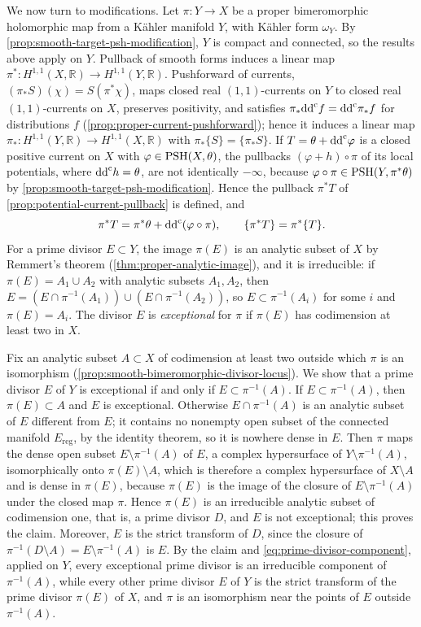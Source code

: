We now turn to modifications. Let $\pi\colon Y\to X$ be a proper bimeromorphic holomorphic map from a K\"ahler manifold $Y$, with K\"ahler form $\omega_Y$. By \cref{prop:smooth-target-psh-modification}, $Y$ is compact and connected, so the results above apply on $Y$. Pullback of smooth forms induces a linear map $\pi^*\colon H^{1,1}(X,\mathbb R)\to H^{1,1}(Y,\mathbb R)$. Pushforward of currents, $(\pi_*S)(\chi)=S(\pi^*\chi)$, maps closed real $(1,1)$-currents on $Y$ to closed real $(1,1)$-currents on $X$, preserves positivity, and satisfies $\pi_*\mathrm{dd}^{\mathrm{c}} f=\mathrm{dd}^{\mathrm{c}}\pi_*f$ for distributions $f$ (\cref{prop:proper-current-pushforward}); hence it induces a linear map $\pi_*\colon H^{1,1}(Y,\mathbb R)\to H^{1,1}(X,\mathbb R)$ with $\pi_*\{S\}=\{\pi_*S\}$. If $T=\theta+\mathrm{dd}^{\mathrm{c}}\varphi$ is a closed positive current on $X$ with $\varphi\in\mathrm{PSH}(X,\theta)$, the pullbacks $(\varphi+h)\circ\pi$ of its local potentials, where $\mathrm{dd}^{\mathrm{c}} h=\theta$, are not identically $-\infty$, because $\varphi\circ\pi\in\mathrm{PSH}(Y,\pi^*\theta)$ by \cref{prop:smooth-target-psh-modification}. Hence the pullback $\pi^*T$ of \cref{prop:potential-current-pullback} is defined, and
\[
 \pi^*T=\pi^*\theta+\mathrm{dd}^{\mathrm{c}}(\varphi\circ\pi),\qquad\{\pi^*T\}=\pi^*\{T\}.
\]
For a prime divisor $E\subset Y$, the image $\pi(E)$ is an analytic subset of $X$ by Remmert's theorem (\cref{thm:proper-analytic-image}), and it is irreducible: if $\pi(E)=A_1\cup A_2$ with analytic subsets $A_1,A_2$, then $E=(E\cap\pi^{-1}(A_1))\cup(E\cap\pi^{-1}(A_2))$, so $E\subset\pi^{-1}(A_i)$ for some $i$ and $\pi(E)=A_i$. The divisor $E$ is \emph{exceptional} for $\pi$ if $\pi(E)$ has codimension at least two in $X$.

Fix an analytic subset $A\subset X$ of codimension at least two outside which $\pi$ is an isomorphism (\cref{prop:smooth-bimeromorphic-divisor-locus}). We show that a prime divisor $E$ of $Y$ is exceptional if and only if $E\subset\pi^{-1}(A)$. If $E\subset\pi^{-1}(A)$, then $\pi(E)\subset A$ and $E$ is exceptional. Otherwise $E\cap\pi^{-1}(A)$ is an analytic subset of $E$ different from $E$; it contains no nonempty open subset of the connected manifold $E_{\mathrm{reg}}$, by the identity theorem, so it is nowhere dense in $E$. Then $\pi$ maps the dense open subset $E\setminus\pi^{-1}(A)$ of $E$, a complex hypersurface of $Y\setminus\pi^{-1}(A)$, isomorphically onto $\pi(E)\setminus A$, which is therefore a complex hypersurface of $X\setminus A$ and is dense in $\pi(E)$, because $\pi(E)$ is the image of the closure of $E\setminus\pi^{-1}(A)$ under the closed map $\pi$. Hence $\pi(E)$ is an irreducible analytic subset of codimension one, that is, a prime divisor $D$, and $E$ is not exceptional; this proves the claim. Moreover, $E$ is the strict transform of $D$, since the closure of $\pi^{-1}(D\setminus A)=E\setminus\pi^{-1}(A)$ is $E$. By the claim and \eqref{eq:prime-divisor-component}, applied on $Y$, every exceptional prime divisor is an irreducible component of $\pi^{-1}(A)$, while every other prime divisor $E$ of $Y$ is the strict transform of the prime divisor $\pi(E)$ of $X$, and $\pi$ is an isomorphism near the points of $E$ outside $\pi^{-1}(A)$.


